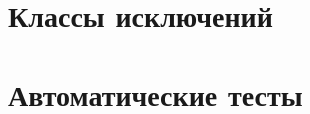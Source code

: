 \documentclass[12pt,a4paper]{report}
\begin{document}
\section{Классы исключений}
%		
\section{Автоматические тесты}

%	
	
	
%	
\end{document}
